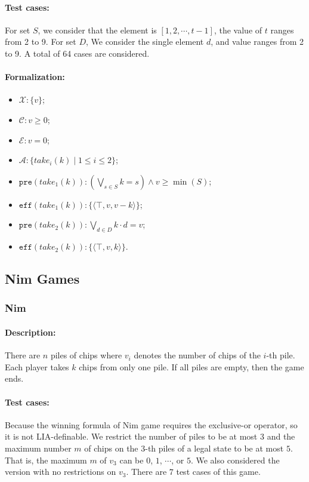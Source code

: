 \documentclass[review]{elsarticle}
\newcommand{\set}[1]{\{ #1 \}}
\newcommand{\tuple}[1]{\langle {#1} \rangle}
\newcommand{\true}{\top}
\newcommand{\statevar}{\mathcal{X}}
\newcommand{\act}{\mathcal{A}}
\newcommand{\constraint}{\mathcal{C}}
\newcommand{\estate}{\mathcal{E}}
\newcommand{\pre}{\mathtt{pre}}
\newcommand{\eff}{\mathtt{eff}}
\begin{document}
\paragraph{Test cases:} For set $S$, we consider that the element is $[1,2,\cdots,t-1]$, the value of $t$ ranges from 2 to 9. 
For set $D$, We consider the single element $d$, and value ranges from 2 to 9. 
A total of 64 cases are considered. 


\paragraph{Formalization:}

\begin{itemize}
	\item $\statevar: \set{v}$;
	\item $\constraint: v \ge 0$;
	\item $\estate: v=0$;
	\item $\act:\set{take_i(k){\mid} 1\le i\le2}$;
	\item $\pre(take_1(k)) :(\bigvee_{s \in S} k = s) \land v \geq \min(S) $;
	\item $\eff(take_1(k)) : \set{\tuple{\true, v, v-k}}$;
	\item $\pre(take_2(k)) :   \bigvee_{d \in D}k \cdot d = v$;
	\item $\eff(take_2(k)) : \set{\tuple{\true, v, k}}$.
\end{itemize}

\subsection{Nim Games}


\subsubsection{Nim \protect\cite{Bou1901}}
\paragraph{Description:}
There are $n$ piles of chips where $v_i$ denotes the number of chips of the $i$-th pile.
Each player takes $k$ chips from only one pile. %
If all piles are empty, then the game ends.

\paragraph{Test cases:}
Because the winning formula of Nim game requires the exclusive-or operator, so it is not LIA-definable.
We restrict the number of piles to be at most $3$ and the maximum number $m$ of chips on the $3$-th piles of a legal state to be at most $5$. 
That is, the maximum $m$ of $v_3$ can be $0$, $1$, $\cdots$, or $5$.
We also considered the version with no restrictions on $v_3$.
There are $7$ test cases of this game.
\end{document}
